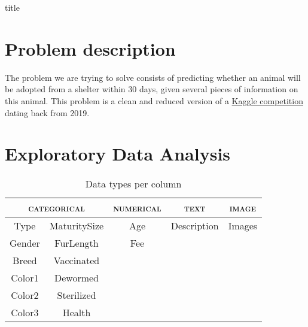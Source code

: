 \documentclass[12pt]{article}
\begin{document}
{title}


\tableofcontents
\listoffigures
\listoftables

{}

\section{Problem description}
The problem we are trying to solve consists of predicting whether an animal will be adopted from a shelter within 30 days, given several pieces of information on this animal. This problem is a clean and reduced version of a \href{https://www.kaggle.com/c/petfinder-adoption-prediction/overview}{Kaggle competition} dating back from 2019.

\section{Exploratory Data Analysis}

\begin{table}[h!]
    \centering
    \begin{tabular}{ccccc}
        \toprule
        \multicolumn{2}{c}{\textsc{categorical}} & \textsc{numerical} & \textsc{text} & \textsc{image}          \\ \midrule
        Type                                     & MaturitySize       & Age           & Description    & Images \\
        Gender                                   & FurLength          & Fee                                     \\
        Breed                                    & Vaccinated                                                   \\
        Color1                                   & Dewormed                                                     \\
        Color2                                   & Sterilized                                                   \\
        Color3                                   & Health                                                       \\
        \bottomrule
    \end{tabular}
    \caption{Data types per column}
\end{table}
\end{document}
